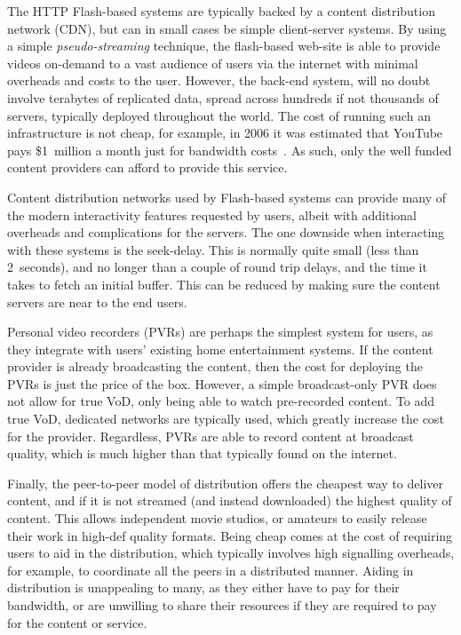     The HTTP Flash-based systems are typically backed by a content distribution network (CDN), but can in small cases be simple client-server systems. By using a simple \emph{pseudo-streaming} technique, the flash-based web-site is able to provide videos on-demand to a vast audience of users via the internet with minimal overheads and costs to the user. However, the back-end system, will no doubt involve terabytes of replicated data, spread across hundreds if not thousands of servers, typically deployed throughout the world. The cost of running such an infrastructure is not cheap, for example, in 2006 it was estimated that YouTube pays \$1~million a month just for bandwidth costs~\cite{frommer2006ytw}. As such, only the well funded content providers can afford to provide this service.

    Content distribution networks used by Flash-based systems can provide many of the modern interactivity features requested by users, albeit with additional overheads and complications for the servers. The one downside when interacting with these systems is the seek-delay. This is normally quite small (less than 2~seconds), and no longer than a couple of round trip delays, and the time it takes to fetch an initial buffer. This can be reduced by making sure the content servers are near to the end users.

    Personal video recorders (PVRs) are perhaps the simplest system for users, as they integrate with users' existing home entertainment systems. If the content provider is already broadcasting the content, then the cost for deploying the PVRs is just the price of the box. However, a simple broadcast-only PVR does not allow for true VoD, only being able to watch pre-recorded content. To add true VoD, dedicated networks are typically used, which greatly increase the cost for the provider. Regardless, PVRs are able to record content at broadcast quality, which is much higher than that typically found on the internet.

    Finally, the peer-to-peer model of distribution offers the cheapest way to deliver content, and if it is not streamed (and instead downloaded) the highest quality of content. This allows independent movie studios, or amateurs to easily release their work in high-def quality formats. Being cheap comes at the cost of requiring users to aid in the distribution, which typically involves high signalling overheads, for example, to coordinate all the peers in a distributed manner. Aiding in distribution is unappealing to many, as they either have to pay for their bandwidth, or are unwilling to share their resources if they are required to pay for the content or service.


